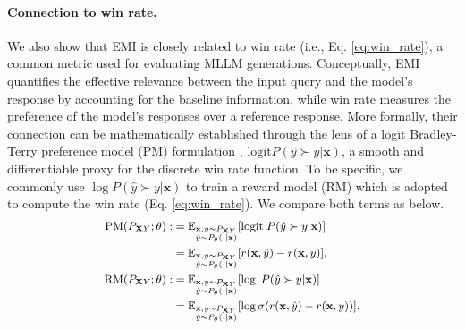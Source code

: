 \paragraph{Connection to win rate.} We also show that EMI is closely related to win rate (i.e., Eq. \eqref{eq:win_rate}), a common metric used for evaluating MLLM generations. Conceptually, EMI quantifies the effective relevance between the input query and the model’s response by accounting for the baseline information, while win rate measures the preference of the model’s responses over a reference response. More formally, their connection can be mathematically established through the lens of a logit Bradley-Terry preference model (PM) formulation \cite{bradley1952rank, hunter2004mm}, $\text{logit} P(\hat{y} \succ y|\mathbf{x})$, a smooth and differentiable proxy for the discrete win rate function. To be specific, we commonly use $\log P(\hat{y} \succ y|\mathbf{x})$ to train a reward model (RM) which is adopted to compute the win rate (Eq. \eqref{eq:win_rate}). We compare both terms as below.
\begin{equation} \label{eq:preference_model}
\small
\begin{split}
 {\text{PM}}(P_{\mathbf{X}Y};\theta):&=\mathbb{E}_{\begin{subarray}{l} \mathbf{x},y \sim P_{\mathbf{X}Y} \\ \hat{y} \sim P_{\theta}(\cdot|\mathbf{x}) \end{subarray}}[\text{logit} \; P(\hat{y} \succ y|\mathbf{x})] \nonumber\\
 &=\mathbb{E}_{\begin{subarray}{l} \mathbf{x},y \sim P_{\mathbf{X}Y} \\ \hat{y} \sim P_{\theta}(\cdot|\mathbf{x}) \end{subarray}}[r(\mathbf{x},\hat{y})-r(\mathbf{x},y)],
 \\
     {\text{RM}}(P_{\mathbf{X}Y};\theta):&=
     \mathbb{E}_{\begin{subarray}{l} \mathbf{x},y \sim P_{\mathbf{X}Y} \\ \hat{y} \sim P_{\theta}(\cdot|\mathbf{x}) \end{subarray}} [\log\; P(\hat{y} \succ y|\mathbf{x})] \nonumber\\
   &= \mathbb{E}_{\begin{subarray}{l} \mathbf{x},y \sim P_{\mathbf{X}Y} \\ \hat{y} \sim P_{\theta}(\cdot|\mathbf{x}) \end{subarray}} [\log \sigma(r(\mathbf{x},\hat{y} ) - r(\mathbf{x},y))],
 \end{split}
\end{equation}
